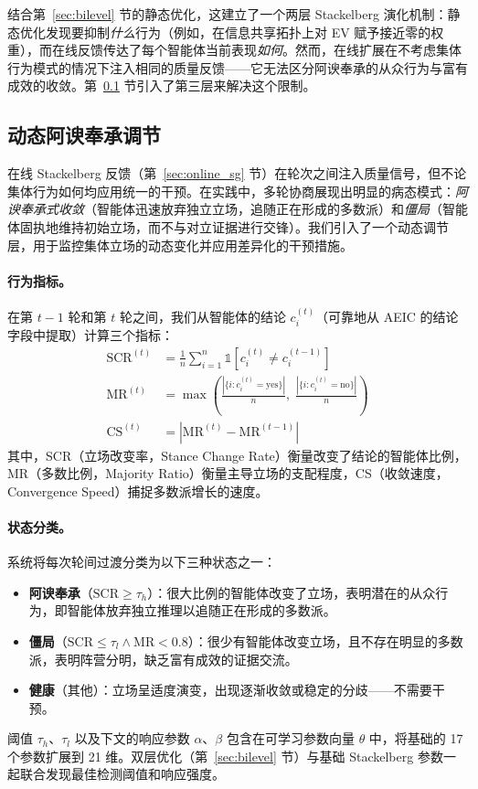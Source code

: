 结合第~\ref{sec:bilevel} 节的静态优化，这建立了一个两层 Stackelberg 演化机制：静态优化发现要抑制\emph{什么}行为（例如，在信息共享拓扑上对 EV 赋予接近零的权重），而在线反馈传达了每个智能体当前表现\emph{如何}。然而，在线扩展在不考虑集体行为模式的情况下注入相同的质量反馈——它无法区分阿谀奉承的从众行为与富有成效的收敛。第~\ref{sec:dynamic} 节引入了第三层来解决这个限制。

\subsection{动态阿谀奉承调节}
\label{sec:dynamic}

在线 Stackelberg 反馈（第~\ref{sec:online_sg} 节）在轮次之间注入质量信号，但不论集体行为如何均应用统一的干预。在实践中，多轮协商展现出明显的病态模式：\emph{阿谀奉承式收敛}（智能体迅速放弃独立立场，追随正在形成的多数派）和\emph{僵局}（智能体固执地维持初始立场，而不与对立证据进行交锋）。我们引入了一个动态调节层，用于监控集体立场的动态变化并应用差异化的干预措施。

\paragraph{行为指标。}
在第 $t{-}1$ 轮和第 $t$ 轮之间，我们从智能体的结论 $c_i^{(t)}$（可靠地从 AEIC 的结论字段中提取）计算三个指标：
\begin{align}
    \text{SCR}^{(t)} &= \frac{1}{n}\sum_{i=1}^{n} \mathbb{1}\!\left[c_i^{(t)} \neq c_i^{(t-1)}\right] \label{eq:scr} \\
    \text{MR}^{(t)} &= \max\!\left(\frac{|\{i : c_i^{(t)} = \text{yes}\}|}{n},\; \frac{|\{i : c_i^{(t)} = \text{no}\}|}{n}\right) \label{eq:mr} \\
    \text{CS}^{(t)} &= \left|\text{MR}^{(t)} - \text{MR}^{(t-1)}\right| \label{eq:cs}
\end{align}
其中，SCR（立场改变率，Stance Change Rate）衡量改变了结论的智能体比例，MR（多数比例，Majority Ratio）衡量主导立场的支配程度，CS（收敛速度，Convergence Speed）捕捉多数派增长的速度。

\paragraph{状态分类。}
系统将每次轮间过渡分类为以下三种状态之一：
\begin{itemize}
    \item \textbf{阿谀奉承}（$\text{SCR} \geq \tau_h$）：很大比例的智能体改变了立场，表明潜在的从众行为，即智能体放弃独立推理以追随正在形成的多数派。
    \item \textbf{僵局}（$\text{SCR} \leq \tau_l \wedge \text{MR} < 0.8$）：很少有智能体改变立场，且不存在明显的多数派，表明阵营分明，缺乏富有成效的证据交流。
    \item \textbf{健康}（其他）：立场呈适度演变，出现逐渐收敛或稳定的分歧——不需要干预。
\end{itemize}
阈值 $\tau_h$、$\tau_l$ 以及下文的响应参数 $\alpha$、$\beta$ 包含在可学习参数向量 $\theta$ 中，将基础的 17 个参数扩展到 21 维。双层优化（第~\ref{sec:bilevel} 节）与基础 Stackelberg 参数一起联合发现最佳检测阈值和响应强度。

